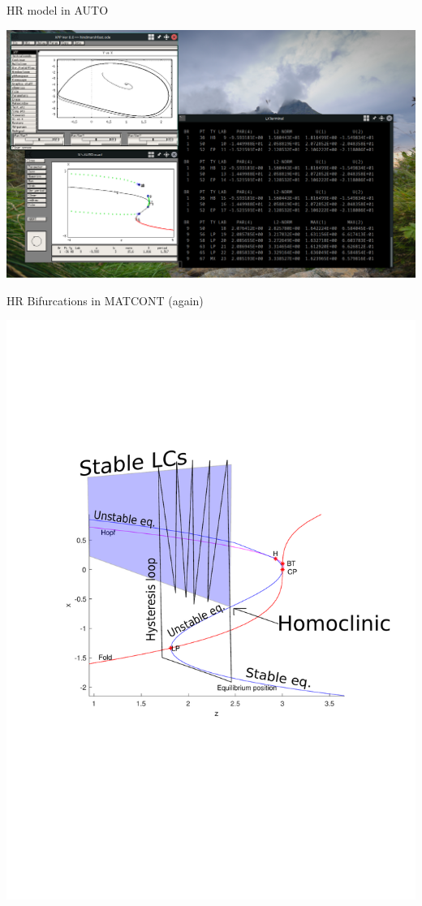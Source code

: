 \documentclass{beamer}
\begin{document}
\begin{frame}[label={sec:orgf55f6e4}]{HR model in AUTO}
\begin{center}
\includegraphics[height=.9\textheight]{auto2.png}
\end{center}
\end{frame}

\begin{frame}[label={sec:org5e1e8f3}]{HR Bifurcations in MATCONT (again)}
\begin{center}
\includegraphics[trim={3cm 9cm 0cm 5cm}, clip,height=.9\textheight]{HRzbBif2 (copy 1).pdf}
\end{center}
\end{frame}
\end{document}
